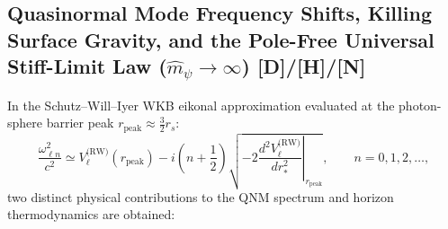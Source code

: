 \documentclass[11pt,a4paper]{article}
\newcommand{\catD}{\textbf{\textcolor{blue!75!black}{[D]}}}
\newcommand{\catH}{\textbf{\textcolor{orange!85!black}{[H]}}}
\newcommand{\catN}{\textbf{\textcolor{teal!75!black}{[N]}}}
\theoremstyle{plain}
\theoremstyle{definition}
\theoremstyle{remark}
\numberwithin{equation}{section}
\begin{document}
\subsection{\texorpdfstring{Quasinormal Mode Frequency Shifts, Killing Surface Gravity, and the Pole-Free Universal Stiff-Limit Law ($\hat{m}_{\psi} \to \infty$) \catD/\catH/\catN}{Quasinormal Mode Frequency Shifts, Killing Surface Gravity, and the Pole-Free Universal Stiff-Limit Law}}

In the Schutz--Will--Iyer WKB eikonal approximation \cite{schutz1985,iyer1987,kokkotas1999} evaluated at the photon-sphere barrier peak $r_{\text{peak}} \approx \frac{3}{2}r_s$:
\begin{equation}
\frac{\omega_{\ell n}^2}{c^2} \simeq V_{\ell}^{\text{(RW)}}\!\left(r_{\text{peak}}\right) - i \left(n + \frac{1}{2}\right) \sqrt{ -2 \left. \frac{d^2 V_{\ell}^{\text{(RW)}}}{dr_*^2} \right|_{r_{\text{peak}}} }, \qquad n = 0, 1, 2, \dots,
\label{eq:wkb_qnm_formula}
\end{equation}
two distinct physical contributions to the QNM spectrum and horizon thermodynamics are obtained:
\end{document}
